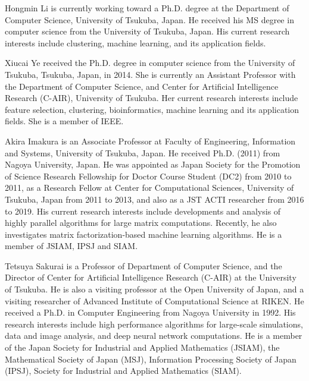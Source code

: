 \documentclass[a4paper,fleqn]{cas-dc}
\begin{document}






Hongmin Li is currently working toward a Ph.D. degree at the Department of Computer Science, University of Tsukuba, Japan. He received his MS degree in computer science from the University of Tsukuba, Japan. His current research interests include clustering, machine learning, and its application fields.
\endbio

Xiucai Ye received the Ph.D. degree in computer science from the University of Tsukuba, Tsukuba, Japan, in 2014. She is currently an Assistant Professor with the Department of Computer Science, and Center for Artificial Intelligence Research (C-AIR), University of Tsukuba. Her current research interests include feature selection, clustering, bioinformatics, machine learning and its application fields. She is a member of IEEE.
\endbio

Akira Imakura is an Associate Professor at Faculty of Engineering, Information and Systems, University of Tsukuba, Japan. He received Ph.D. (2011) from Nagoya University, Japan. He was appointed as Japan Society for the Promotion of Science Research Fellowship for Doctor Course Student (DC2) from 2010 to 2011, as a Research Fellow at Center for Computational Sciences, University of Tsukuba, Japan from 2011 to 2013, and also as a JST ACTI researcher from 2016 to 2019. His current research interests include developments and analysis of highly parallel algorithms for large matrix computations. Recently, he also investigates matrix factorization-based machine learning algorithms. He is a member of JSIAM, IPSJ and SIAM.
\endbio

Tetsuya Sakurai is a Professor of Department of Computer Science, and the Director of Center for Artificial Intelligence Research (C-AIR) at the University of Tsukuba. He is also a visiting professor at the Open University of Japan, and a visiting researcher of Advanced Institute of Computational Science at RIKEN. He received a Ph.D. in Computer Engineering from Nagoya University in 1992. His research interests include high performance algorithms for large-scale simulations, data and image analysis, and deep neural network computations. He is a member of the Japan Society for Industrial and Applied Mathematics (JSIAM), the Mathematical Society of Japan (MSJ), Information Processing Society of Japan (IPSJ), Society for Industrial and Applied Mathematics (SIAM).
\endbio
\end{document}
